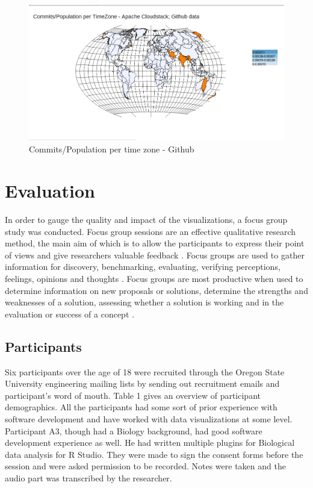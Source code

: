 \documentclass[double,12pt]{beavtex}
\begin{document}
\begin{figure}[H]
\centering
\includegraphics[width=130mm,height=60mm]{image10.png}
\caption{Commits/Population per time zone - Github}
\label{fig:div3}
\end{figure}

\chapter{Evaluation}
In order to gauge the quality and impact of the visualizations, a focus group study was conducted. Focus group sessions are an effective qualitative research method, the main aim of which is to allow the participants to express their point of views and give researchers valuable feedback \cite{villard}.  Focus groups are used to gather information for discovery, benchmarking, evaluating, verifying perceptions, feelings, opinions and thoughts \cite{patton1990}. Focus groups are most productive when used to determine information on new proposals or solutions, determine the strengths and weaknesses of a solution, assessing whether a solution is working and in the evaluation or success of a concept \cite{greenbaum1993}.

\section{Participants}
Six participants over the age of 18 were recruited through the Oregon State University engineering mailing lists by sending out recruitment emails and participant's word of mouth. Table 1 gives an overview of participant demographics. All the participants had some sort of prior experience with software development and have worked with data visualizations at some level. Participant A3, though had a Biology background, had good software development experience as well. He had written multiple plugins for Biological data analysis for R Studio. They were made to sign the consent forms before the session and were asked permission to be recorded. Notes were taken and the audio part was transcribed by the researcher.
\end{document}
